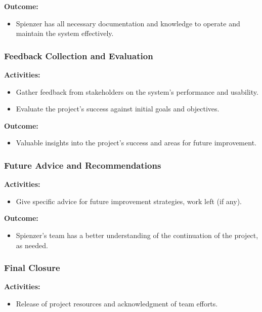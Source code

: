 \documentclass[12pt,a4paper]{article}
\begin{document}
\noindent \textbf{Outcome:}
\begin{itemize}
    \item Spienzer has all necessary documentation and knowledge to operate and maintain the system effectively.
\end{itemize}

\subsubsection{Feedback Collection and Evaluation}

\noindent \textbf{Activities:}
\begin{itemize}
    \item Gather feedback from stakeholders on the system's performance and usability.
    \item Evaluate the project's success against initial goals and objectives.
\end{itemize}

\noindent \textbf{Outcome:}
\begin{itemize}
    \item Valuable insights into the project's success and areas for future improvement.
\end{itemize}

\subsubsection{Future Advice and Recommendations}

\noindent \textbf{Activities:}
\begin{itemize}
    \item Give specific advice for future improvement strategies, work left (if any).
\end{itemize}

\noindent \textbf{Outcome:}
\begin{itemize}
    \item Spienzer’s team has a better understanding of the continuation of the project, as needed.
\end{itemize}

\subsubsection{Final Closure}

\noindent \textbf{Activities:}
\begin{itemize}
    \item Release of project resources and acknowledgment of team efforts.
\end{itemize}
\end{document}
